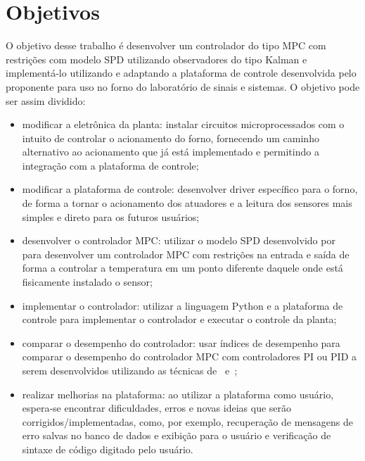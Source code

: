 \section{Objetivos}%
\label{sec:objectives}

O objetivo desse trabalho é desenvolver um controlador do tipo \ac{MPC} com
restrições com modelo \ac{SPD} utilizando observadores do tipo Kalman e
implementá-lo utilizando e adaptando a plataforma de controle desenvolvida pelo
proponente para uso no forno do laboratório de sinais e sistemas. O objetivo
pode ser assim dividido:

\begin{itemize}
      \item modificar a eletrônica da planta: instalar circuitos
            microprocessados com o intuito de controlar o acionamento do forno,
            fornecendo um caminho alternativo ao acionamento que já está
            implementado e permitindo a integração com a plataforma de controle;
      \item modificar a plataforma de controle: desenvolver driver específico
            para o forno, de forma a tornar o acionamento dos atuadores e a
            leitura dos sensores mais simples e direto para os futuros usuários;
      \item desenvolver o controlador \ac{MPC}\@: utilizar o modelo \ac{SPD}
            desenvolvido por~\textcite{masterthesis:nelson} para desenvolver um
            controlador \ac{MPC} com restrições na entrada e saída de forma a
            controlar a temperatura em um ponto diferente daquele onde está
            fisicamente instalado o sensor;
      \item implementar o controlador: utilizar a linguagem Python e a
            plataforma de controle para implementar o controlador e executar o
            controle da planta;
      \item comparar o desempenho do controlador: usar índices de desempenho
            para comparar o desempenho do controlador \ac{MPC} com controladores
            PI ou PID a serem desenvolvidos utilizando as técnicas
            de~\textcite{article:clarke} e~\textcite{article:martins};
      \item realizar melhorias na plataforma: ao utilizar a plataforma como
            usuário, espera-se encontrar dificuldades, erros e novas ideias que
            serão corrigidos/implementadas, como, por exemplo, recuperação de
            mensagens de erro salvas no banco de dados e exibição para o usuário
            e verificação de sintaxe de código digitado pelo usuário.
\end{itemize}

